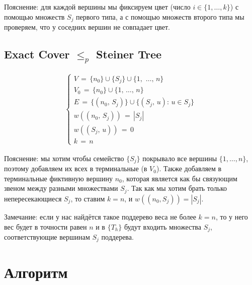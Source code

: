 \documentclass[a4paper,12pt]{article}
\begin{document}
    \noindent Пояснение: для каждой вершины мы фиксируем цвет (число $i \in \{1, \dots, k\}$) с помощью множеств $S_j$ первого типа, а с помощью множеств второго типа мы проверяем, что у соседних вершин не совпадает цвет.
    
    \subsection{Exact Cover \texorpdfstring{$\leqslant_p$}{<=p} Steiner Tree}

    \vspace{1em}
    
    \[
        \begin{array}{l}
        \begin{cases}
            V \, = \, \{n_0\} \cup \{S_j\} \cup \{1, \, \, \dots, \, n\}\\
            V_0 \, = \, \{n_0\} \cup \{1, \, \dots, \, n\}\\
            E \, = \, \{\left(n_0, \, S_j\right)\} \cup \{\left(S_j, \, u\right): \, u \in S_j\}\\
            w\left((n_0, \, S_j)\right) \, = \, |S_j|\\
            w\left((S_j, \, u)\right) \, = \, 0\\
            k \, = \, n
        \end{cases}
        \end{array}
    \]

    \vspace{1em}

    \noindent Пояснение: мы хотим чтобы семейство $\{S_j\}$ покрывало все вершины $\{1, \dots, n\}$, поэтому добавляем их всех в терминальные (в $V_0$). Также добавляем в терминальные фиктивную вершину $n_0$, которая является как бы связующим звеном между разными множествами $S_j$. Так как мы хотим брать только непересекающиеся $S_j$, то ставим $k = n$, и $w\left((n_0, S_j)\right) = |S_j|$.

    \vspace{1em}

    \noindent Замечание: если у нас найдётся такое поддерево веса не более $k = n$, то у него вес будет в точности равен $n$ и в $\{T_h\}$ будут входить множества $S_j$, соответствующие вершинам $S_j$ поддерева.

    \vfill \newpage

    \section{Алгоритм}
\end{document}

